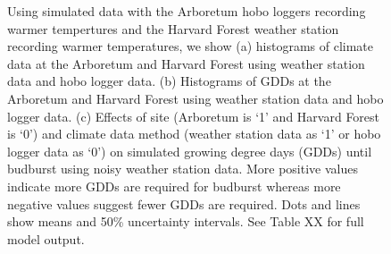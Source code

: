 \documentclass{article}\usepackage[]{graphicx}\usepackage[]{color}
\begin{document}
\begin{figure}
\caption{ Using simulated data with the Arboretum hobo loggers recording warmer tempertures and the Harvard Forest weather station recording warmer temperatures, we show (a) histograms of climate data at the Arboretum and Harvard Forest using weather station data and hobo logger data. (b) Histograms of GDDs at the Arboretum and Harvard Forest using weather station data and hobo logger data. (c) Effects of site (Arboretum is `1' and Harvard Forest is `0') and climate data method (weather station data as `1' or hobo logger data as `0') on simulated growing degree days (GDDs) until budburst using noisy weather station data. More positive values indicate more GDDs are required for budburst whereas more negative values suggest fewer GDDs are required. Dots and lines show means and 50\% uncertainty intervals. See Table XX for full model output.}
\label{fig:urbanws}
\end{figure}
\end{document}
